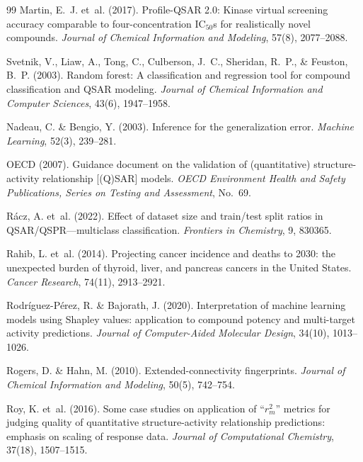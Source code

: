 \documentclass[11pt]{article}
\begin{document}
\begin{thebibliography}{99}
Martin, E.~J. et~al. (2017).
Profile-QSAR 2.0: Kinase virtual screening accuracy comparable to four-concentration IC$_{50}$s for realistically novel compounds.
\textit{Journal of Chemical Information and Modeling}, 57(8), 2077--2088.

Svetnik, V., Liaw, A., Tong, C., Culberson, J.~C., Sheridan, R.~P., \& Feuston, B.~P. (2003).
Random forest: A classification and regression tool for compound classification and QSAR modeling.
\textit{Journal of Chemical Information and Computer Sciences}, 43(6), 1947--1958.

Nadeau, C. \& Bengio, Y. (2003).
Inference for the generalization error.
\textit{Machine Learning}, 52(3), 239--281.

OECD (2007).
Guidance document on the validation of (quantitative) structure-activity relationship [(Q)SAR] models.
\textit{OECD Environment Health and Safety Publications, Series on Testing and Assessment}, No.~69.

R\'acz, A. et~al. (2022).
Effect of dataset size and train/test split ratios in QSAR/QSPR---multiclass classification.
\textit{Frontiers in Chemistry}, 9, 830365.

Rahib, L. et~al. (2014).
Projecting cancer incidence and deaths to 2030: the unexpected burden of thyroid, liver, and pancreas cancers in the United States.
\textit{Cancer Research}, 74(11), 2913--2921.

Rodr\'iguez-P\'erez, R. \& Bajorath, J. (2020).
Interpretation of machine learning models using Shapley values: application to compound potency and multi-target activity predictions.
\textit{Journal of Computer-Aided Molecular Design}, 34(10), 1013--1026.

Rogers, D. \& Hahn, M. (2010).
Extended-connectivity fingerprints.
\textit{Journal of Chemical Information and Modeling}, 50(5), 742--754.

Roy, K. et~al. (2016).
Some case studies on application of ``$r_m^2$'' metrics for judging quality of quantitative structure-activity relationship predictions: emphasis on scaling of response data.
\textit{Journal of Computational Chemistry}, 37(18), 1507--1515.


\end{thebibliography}
\end{document}
